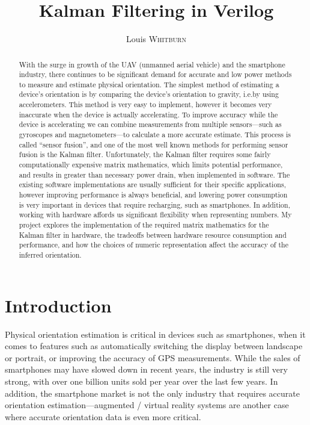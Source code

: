 \documentclass[12pt]{article}
\title{Kalman Filtering in Verilog}
\author{Louis \textsc{Whitburn}}
\begin{document}
\maketitle

\begin{abstract}

With the surge in growth of the UAV (unmanned aerial vehicle) and the smartphone industry, there continues to be significant demand for accurate and low power methods to measure and estimate physical orientation. The simplest method of estimating a device's orientation is by comparing the device's orientation to gravity, i.e.\@ by using accelerometers. This method is very easy to implement, however it becomes very inaccurate when the device is actually accelerating. To improve accuracy while the device is accelerating we can combine measurements from multiple sensors---such as gyroscopes and magnetometers---to calculate a more accurate estimate. This process is called ``sensor fusion'', and one of the most well known methods for performing sensor fusion is the Kalman filter. Unfortunately, the Kalman filter requires some fairly computationally expensive matrix mathematics, which limits potential performance, and results in greater than necessary power drain, when implemented in software. The existing software implementations are usually sufficient for their specific applications, however improving performance is always beneficial, and lowering power consumption is very important in devices that require recharging, such as smartphones. In addition, working with hardware affords us significant flexibility when representing numbers. My project explores the implementation of the required matrix mathematics for the Kalman filter in hardware, the tradeoffs between hardware resource consumption and performance, and how the choices of numeric representation affect the accuracy of the inferred orientation.

\end{abstract}

\section{Introduction}

Physical orientation estimation is critical in devices such as smartphones, when it comes to features such as automatically switching the display between landscape or portrait, or improving the accuracy of GPS measurements. While the sales of smartphones may have slowed down in recent years, the industry is still very strong, with over one billion units sold per year \cite{Mongardini_2020} over the last few years. In addition, the smartphone market is not the only industry that requires accurate orientation estimation---augmented / virtual reality systems are another case where accurate orientation data is even more critical. 
\end{document}

